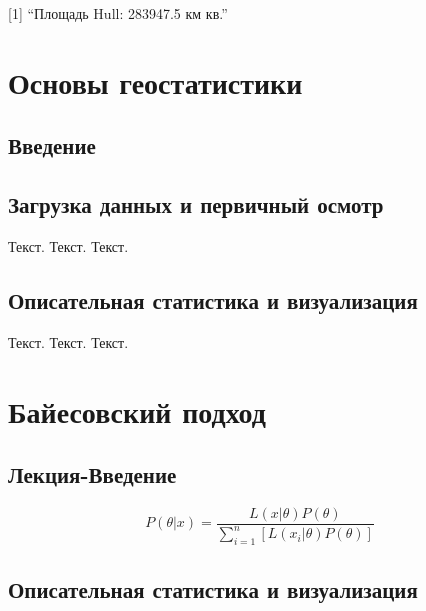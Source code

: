 \documentclass[
  letterpaper,
  DIV=11,
  numbers=noendperiod]{scrreprt}
\begin{document}
{[}1{]} ``Площадь Hull: 283947.5 км кв.''


\chapter{Основы
геостатистики}\label{ux43eux441ux43dux43eux432ux44b-ux433ux435ux43eux441ux442ux430ux442ux438ux441ux442ux438ux43aux438}

\section{Введение}\label{ux432ux432ux435ux434ux435ux43dux438ux435-4}

\section{Загрузка данных и первичный
осмотр}\label{ux437ux430ux433ux440ux443ux437ux43aux430-ux434ux430ux43dux43dux44bux445-ux438-ux43fux435ux440ux432ux438ux447ux43dux44bux439-ux43eux441ux43cux43eux442ux440-1}

Текст. Текст. Текст.

\section{Описательная статистика и
визуализация}\label{ux43eux43fux438ux441ux430ux442ux435ux43bux44cux43dux430ux44f-ux441ux442ux430ux442ux438ux441ux442ux438ux43aux430-ux438-ux432ux438ux437ux443ux430ux43bux438ux437ux430ux446ux438ux44f-1}

Текст. Текст. Текст.


\chapter{Байесовский
подход}\label{ux431ux430ux439ux435ux441ux43eux432ux441ux43aux438ux439-ux43fux43eux434ux445ux43eux434}

\section{Лекция-Введение}\label{ux43bux435ux43aux446ux438ux44f-ux432ux432ux435ux434ux435ux43dux438ux435}

\[  
P(\theta|x)=\frac{L(x|\theta)P(\theta)}{\sum\limits_{i=1}^{n}{\left[ L(x_i|\theta)P(\theta)\right]}}  
\]

\section{Описательная статистика и
визуализация}\label{ux43eux43fux438ux441ux430ux442ux435ux43bux44cux43dux430ux44f-ux441ux442ux430ux442ux438ux441ux442ux438ux43aux430-ux438-ux432ux438ux437ux443ux430ux43bux438ux437ux430ux446ux438ux44f-2}
\end{document}
